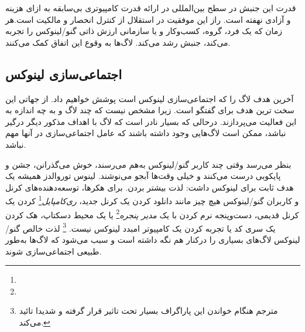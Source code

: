 
قدرت این جنبش در سطح بین‌المللی در ارائه قدرت کامپیوتری بی‌سابقه
به ازای هزینه و آزادی نهفته است. راز این موفقیت در استقلال
از کنترل انحصار و مالکیت است.هر زمان که یک فرد، گروه، کسب‌وکار
و یا سازمانی ارزش ذاتی گنو/لینوکس را تجربه می‌کند،  جنبش رشد می‌کند.
لاگ‌ها به وقوع این اتفاق کمک می‌کنند.

\subsection{اجتماعی‌سازی لینوکس}

آخرین هدف لاگ را که اجتماعی‌سازی لینوکس است پوشش خواهیم داد.
از جهاتی این سخت ترین هدف برای گفتگو است. زیرا مشخص نیست که
چند لاگ و به چه اندازه به این فعالیت می‌پردازند.
درحالی که بسیار نادر است که لاگ با اهداف مذکور دیگر درگیر نباشد،
ممکن است لاگ‌هایی وجود داشته باشند که عامل اجتماعی‌سازی در آنها مهم نباشد.

بنظر می‌رسد وقتی چند کاربر گنو/لینوکس به‌هم می‌رسند، خوش می‌گذرانن، جشن و پایکوبی
درست می‌کنند و خیلی وقت‌ها آبجو می‌نوشند. لینوس توروالدز همیشه یک هدف ثابت برای
لینوکس داشت: لذت بیشتر بردن.
برای هکرها، توسعه‌دهنده‌های کرنل و کاربران گنو/لینوکس هیچ چیز مانند دانلود کردن
یک کرنل جدید،
\emph{ری‌کامپایل}\footnote{}
کردن یک کرنل قدیمی، دست‌وپنجه نرم کردن با یک
\emph{مدیر پنجره}\footnote{}
یا یک محیط دسکتاپ، هک کردن یک سری کد یا تجربه کردن یک کامپیوتر امبدد لینوکس نیست.
\footnote{مترجم هنگام خواندن این پاراگراف بسیار تحت تاثیر قرار گرفته و شدیدا تائید می‌کند.}
لذت خالص گنو/لینوکس لاگ‌های بسیاری را درکنار هم نگه داشته است و سبب می‌شود که لاگ‌ها
به‌طور طبیعی اجتماعی‌سازی شوند.

